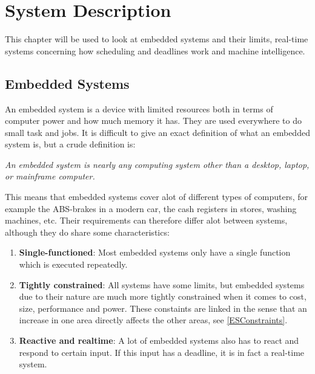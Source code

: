 \chapter{System Description}
This chapter will be used to look at embedded systems and their limits,
real-time systems concerning how scheduling and deadlines work and machine
intelligence.

\section{Embedded Systems}
An embedded system is a device with limited resources both in terms of computer
power and how much memory it has. They are used everywhere to do small task and
jobs. It is difficult to give an exact definition of what an embedded system is,
but a crude definition\citep[ch.1.1]{vahid1999embedded} is:\nl

\textit{An  embedded  system  is  nearly  any computing system other than a desktop,
laptop, or  mainframe  computer.}\nl

This means that embedded systems cover alot of different types of computers, for example
the ABS-brakes in a modern car, the cash registers in stores, washing machines, etc.
Their requirements can therefore differ alot between systems, although they do
share some characteristics:

\begin{enumerate}
  \item \textbf{Single-functioned}:  Most embedded systems only have a single
  function which is executed repeatedly.
  \item \textbf{Tightly constrained}: All systems have some limits, but embedded
  systems due to their nature are much more tightly constrained when it comes to
  cost, size, performance and power. These constaints are linked in the sense
  that an increase in one area directly affects the other areas, see
  \autoref{ESConstraints}.
  \item \textbf{Reactive and realtime}: A lot of embedded systems also has to
  react and respond to certain input. If this input has a deadline, it is in
  fact a real-time system.
\end{enumerate}







